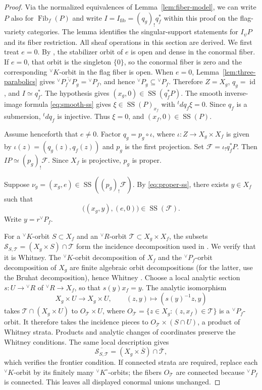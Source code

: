 \documentclass[10pt]{amsart}
\numberwithin{equation}{section}
\theoremstyle{plain}
\theoremstyle{definition}
\theoremstyle{remark}
\newcommand{\vR}{{}^{\vee}R}
\newcommand{\vK}{{}^{\vee}K}
\newcommand{\vP}{{}^{\vee}P}
\newcommand{\cF}{\mathcal F}
\newcommand{\SSupp}{\operatorname{SS}}
\begin{document}
\begin{proof}
Via the normalized equivalences of Lemma~\ref{lem:fiber-model}, we can write
$P$ also for $\operatorname{Fib}_f(P)$ and write
$I=I_{\mathrm{fib}}=(q_g)_!q_f^*$ within this proof on the flag-variety
categories. The lemma identifies the singular-support statements for
$I_\psi P$ and its fiber restriction. All sheaf operations
in this section are derived.
We first treat $e=0$. By \cite[Proposition~3.7.1]{AIMV26}, the stabilizer
orbit of $e$ is open and dense in the conormal fiber. If $e=0$, that orbit
is the singleton $\{0\}$, so the conormal fiber is zero and the
corresponding $\vK$-orbit in the flag fiber is open. When $e=0$,
Lemma~\ref{lem:three-parabolics} gives
$\overline{\vP_f\vP_g}=\vP_f$, and hence
$\vP_g\subseteq\vP_f$. Therefore $Z=X_g$,
$q_g=\operatorname{id}$, and
$I\simeq q_f^*$. The hypothesis gives
$(x_g,0)\in\SSupp(q_f^*P)$. The smooth inverse-image formula
\eqref{eq:smooth-ss} gives $\xi\in\SSupp(P)_{x_f}$ with
${}^tdq_f\xi=0$. Since $q_f$ is a submersion, ${}^tdq_f$ is injective.
Thus $\xi=0$, and $(x_f,0)\in\SSupp(P)$.

Assume henceforth that $e\neq0$. Factor $q_g=p_g\circ\iota$, where
$\iota:Z\to X_g\times X_f$ is given by
$\iota(z)=(q_g(z),q_f(z))$ and $p_g$ is the first projection. Set
$\cF=\iota_!q_f^*P$. Then $I P\simeq(p_g)_!\cF$. Since $X_f$ is
projective, $p_g$ is proper.

Suppose $\nu_g=(x_g,e)\in\SSupp((p_g)_!\cF)$. By
\eqref{eq:proper-ss}, there exists $y\in X_f$ such that
\begin{equation}\label{eq:lifted-covector}
  \bigl((x_g,y),(e,0)\bigr)\in\SSupp(\cF).
\end{equation}
Write $y=r\vP_f$.

For a $\vK$-orbit
$S\subset X_f$ and an $\vR$-orbit
$\mathcal T\subset X_g\times X_f$, the subsets
$\mathcal S_{S,\mathcal T}=(X_g\times S)\cap\mathcal T$
form the incidence decomposition used in
\cite[(4.6.5)]{AIMV26}. We verify that it is Whitney.
The $\vK$-orbit decomposition of $X_f$ and the $\vP_f$-orbit
decomposition of $X_g$ are finite algebraic orbit decompositions
(for the latter, use the Bruhat decomposition), hence Whitney
\cite[Section~2.3, p.~3582]{FR18}.
Choose a local analytic section $s:U\to\vR$ of
$\vR\to X_f$, so that $s(y)x_f=y$. The analytic isomorphism
\[
 X_g\times U\longrightarrow X_g\times U,\qquad
 (z,y)\longmapsto(s(y)^{-1}z,y)
\]
takes $\mathcal T\cap(X_g\times U)$ to
$O_{\mathcal T}\times U$, where
$O_{\mathcal T}=\{z\in X_g:(z,x_f)\in\mathcal T\}$ is a
$\vP_f$-orbit. It therefore takes the incidence pieces to
$O_{\mathcal T}\times(S\cap U)$, a product of Whitney strata.
Products and analytic changes of coordinates preserve the Whitney
conditions. The same local description gives
\[
 \overline{\mathcal S_{S,\mathcal T}}
 =(X_g\times\overline S)\cap\overline{\mathcal T},
\]
which verifies the frontier condition. If connected strata are
required, replace each $\vK$-orbit by its finitely many
$\vK^\circ$-orbits; the fibers $O_{\mathcal T}$ are connected
because $\vP_f$ is connected. This leaves all displayed conormal
unions unchanged.


\end{proof}
\end{document}
